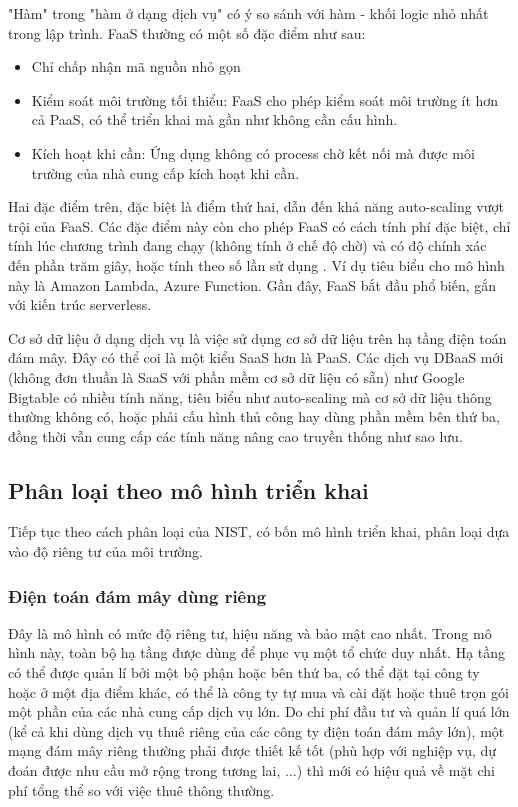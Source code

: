 \documentclass{article}
\begin{document}
"Hàm" trong "hàm ở dạng dịch vụ" có ý so sánh với hàm - khối logic nhỏ nhất
trong lập trình. FaaS thường có một số đặc điểm như sau:

\begin{itemize}
    \item Chỉ chấp nhận mã nguồn nhỏ gọn
    \item Kiểm soát môi trường tối thiểu: FaaS cho phép kiểm soát môi trường ít
    hơn cả PaaS, có thể triển khai mà gần như không cần cấu hình.
    \item Kích hoạt khi cần: Ứng dụng không có process chờ kết nối mà được môi
    trường của nhà cung cấp kích hoạt khi cần.
\end{itemize}

Hai đặc điểm trên, đặc biệt là điểm thứ hai, dẫn đến khả năng auto-scaling vượt
trội của FaaS. Các đặc điểm này còn cho phép FaaS có cách tính phí đặc biệt, chỉ
tính lúc chương trình đang chạy (không tính ở chế độ chờ) và có độ chính xác đến
phần trăm giây, hoặc tính theo số lần sử dụng \cite{CFPvF}. Ví dụ tiêu biểu cho
mô hình này là Amazon Lambda, Azure Function. Gần đây, FaaS bắt đầu phổ biến,
gắn với kiến trúc serverless.

Cơ sở dữ liệu ở dạng dịch vụ là việc sử dụng cơ sở dữ liệu trên hạ tầng điện
toán đám mây. Đây có thể coi là một kiểu SaaS hơn là PaaS. Các dịch vụ DBaaS mới
(không đơn thuần là SaaS với phần mềm cơ sở dữ liệu có sẵn) như Google Bigtable
có nhiều tính năng, tiêu biểu như auto-scaling mà cơ sở dữ liệu thông thường
không có, hoặc phải cấu hình thủ công hay dùng phần mềm bên thứ ba, đồng thời
vẫn cung cấp các tính năng nâng cao truyền thống như sao lưu.

\subsection{Phân loại theo mô hình triển khai}

Tiếp tục theo cách phân loại của NIST, có bốn mô hình triển khai, phân loại dựa
vào độ riêng tư của môi trường.

\subsubsection{Điện toán đám mây dùng riêng}

Đây là mô hình có mức độ riêng tư, hiệu năng và bảo mật cao nhất. Trong mô hình
này, toàn bộ hạ tầng được dùng để phục vụ một tổ chức duy nhất. Hạ tầng có thể
được quản lí bởi một bộ phận hoặc bên thứ ba, có thể đặt tại công ty hoặc ở một
địa điểm khác, có thể là công ty tự mua và cài đặt hoặc thuê trọn gói một phần
của các nhà cung cấp dịch vụ lớn. Do chi phí đầu tư và quản lí quá lớn (kể cả
khi dùng dịch vụ thuê riêng của các công ty điện toán đám mây lớn), một mạng đám
mây riêng thường phải được thiết kế tốt (phù hợp với nghiệp vụ, dự đoán được nhu
cầu mở rộng trong tương lai, ...) thì mới có hiệu quả về mặt chi phí tổng thể so
với việc thuê thông thường.
\end{document}
